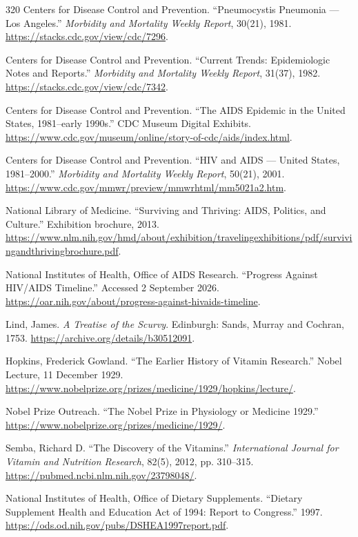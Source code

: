 \documentclass[12pt,oneside]{book}
\begin{document}
\begin{thebibliography}{320}
Centers for Disease Control and Prevention. ``Pneumocystis Pneumonia --- Los
Angeles.'' \emph{Morbidity and Mortality Weekly Report}, 30(21), 1981.
\url{https://stacks.cdc.gov/view/cdc/7296}.

Centers for Disease Control and Prevention. ``Current Trends: Epidemiologic
Notes and Reports.'' \emph{Morbidity and Mortality Weekly Report}, 31(37),
1982. \url{https://stacks.cdc.gov/view/cdc/7342}.

Centers for Disease Control and Prevention. ``The AIDS Epidemic in the United
States, 1981--early 1990s.'' CDC Museum Digital Exhibits.
\url{https://www.cdc.gov/museum/online/story-of-cdc/aids/index.html}.

Centers for Disease Control and Prevention. ``HIV and AIDS --- United States,
1981--2000.'' \emph{Morbidity and Mortality Weekly Report}, 50(21), 2001.
\url{https://www.cdc.gov/mmwr/preview/mmwrhtml/mm5021a2.htm}.

National Library of Medicine. ``Surviving and Thriving: AIDS, Politics, and
Culture.'' Exhibition brochure, 2013.
\url{https://www.nlm.nih.gov/hmd/about/exhibition/travelingexhibitions/pdf/survivingandthrivingbrochure.pdf}.

National Institutes of Health, Office of AIDS Research. ``Progress Against
HIV/AIDS Timeline.'' Accessed 2 September 2026.
\url{https://oar.nih.gov/about/progress-against-hivaids-timeline}.

Lind, James. \emph{A Treatise of the Scurvy}. Edinburgh: Sands, Murray and
Cochran, 1753. \url{https://archive.org/details/b30512091}.

Hopkins, Frederick Gowland. ``The Earlier History of Vitamin Research.'' Nobel
Lecture, 11 December 1929.
\url{https://www.nobelprize.org/prizes/medicine/1929/hopkins/lecture/}.

Nobel Prize Outreach. ``The Nobel Prize in Physiology or Medicine 1929.''
\url{https://www.nobelprize.org/prizes/medicine/1929/}.

Semba, Richard D. ``The Discovery of the Vitamins.'' \emph{International
Journal for Vitamin and Nutrition Research}, 82(5), 2012, pp. 310--315.
\url{https://pubmed.ncbi.nlm.nih.gov/23798048/}.

National Institutes of Health, Office of Dietary Supplements. ``Dietary
Supplement Health and Education Act of 1994: Report to Congress.'' 1997.
\url{https://ods.od.nih.gov/pubs/DSHEA1997report.pdf}.


\end{thebibliography}
\end{document}

